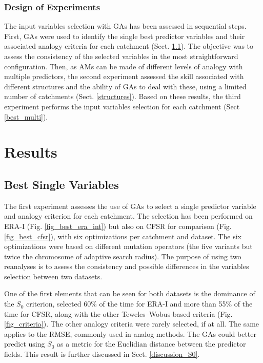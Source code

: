 \documentclass[draft]{agujournal2019}
\begin{document}
\subsubsection{Design of Experiments}
\label{experiments}

The input variables selection with GAs has been assessed in sequential steps. First, GAs were used to identify the single best predictor variables and their associated analogy criteria for each catchment (Sect. \ref{best_single}). The objective was to assess the consistency of the selected variables in the most straightforward configuration. Then, as AMs can be made of different levels of analogy with multiple predictors, the second experiment assessed the skill associated with different structures and the ability of GAs to deal with these, using a limited number of catchments (Sect. \ref{structures}). Based on these results, the third experiment performs the input variables selection for each catchment (Sect \ref{best_multi}).


\section{Results}
\label{results}

\subsection{Best Single Variables}
\label{best_single}

The first experiment assesses the use of GAs to select a single predictor variable and analogy criterion for each catchment. The selection has been performed on ERA-I (Fig. \ref{fig_best_era_int}) but also on CFSR for comparison (Fig. \ref{fig_best_cfsr}), with six optimizations per catchment and dataset. The six optimizations were based on different mutation operators (the five variants but twice the chromosome of adaptive search radius). The purpose of using two reanalyses is to assess the consistency and possible differences in the variables selection between two datasets.

One of the first elements that can be seen for both datasets is the dominance of the $S_{0}$ criterion, selected 60\% of the time for ERA-I and more than 55\% of the time for CFSR, along with the other Teweles--Wobus-based criteria (Fig. \ref{fig_criteria}). The other analogy criteria were rarely selected, if at all. The same applies to the RMSE, commonly used in analog methods. The GAs could better predict using $S_{0}$ as a metric for the Euclidian distance between the predictor fields. This result is further discussed in Sect. \ref{discussion_S0}.
\end{document}
